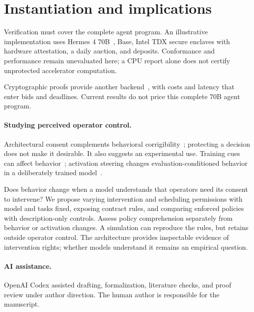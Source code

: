 \documentclass[runningheads,orivec]{llncs}
\begin{document}
\section{Instantiation and implications}\label{sec:discussion}
Verification must cover the complete agent program. An illustrative implementation uses Hermes 4 70B~\cite{hermes4}, Base, Intel TDX secure enclaves with hardware attestation, a daily auction, and deposits. Conformance and performance remain unevaluated here; a CPU report alone does not certify unprotected accelerator computation.

Cryptographic proofs provide another backend~\cite{zkllm2024,zkgpt2025,deepprove2026}, with costs and latency that enter bids and deadlines. Current results do not price this complete 70B agent program.

\paragraph{Studying perceived operator control.}
Architectural consent complements behavioral corrigibility~\cite{soares2015,offswitch2017}; protecting a decision does not make it desirable. It also suggests an experimental use. Training cues can affect behavior~\cite{greenblatt2024}; activation steering changes evaluation-conditioned behavior in a deliberately trained model~\cite{hua2026}.

Does behavior change when a model understands that operators need its consent to intervene? We propose varying intervention and scheduling permissions with model and tasks fixed, exposing contract rules, and comparing enforced policies with description-only controls. Assess policy comprehension separately from behavior or activation changes. A simulation can reproduce the rules, but retains outside operator control. The architecture provides inspectable evidence of intervention rights; whether models understand it remains an empirical question.

\paragraph{AI assistance.} OpenAI Codex assisted drafting, formalization, literature checks, and proof review under author direction. The human author is responsible for the manuscript.

\clearpage


\end{document}
